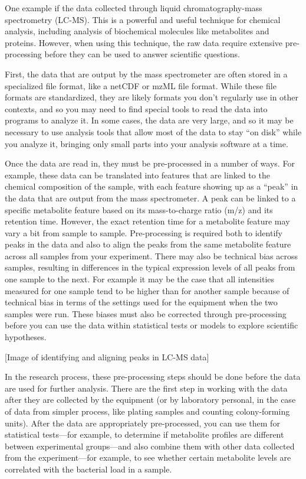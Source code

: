 \documentclass[]{tufte-book}
\begin{document}
One example if the data collected through liquid chromatography-mass
spectrometry (LC-MS). This is a powerful and useful technique for chemical
analysis, including analysis of biochemical molecules like metabolites and
proteins. However, when using this technique, the raw data require extensive
pre-processing before they can be used to answer scientific questions.

First, the data that are output by the mass spectrometer are often stored in a
specialized file format, like a netCDF or mzML file format. While these file
formats are standardized, they are likely formats you don't regularly use in
other contexts, and so you may need to find special tools to read the data into
programs to analyze it. In some cases, the data are very large, and so it may be
necessary to use analysis tools that allow most of the data to stay ``on disk''
while you analyze it, bringing only small parts into your analysis software at a
time.

Once the data are read in, they must be pre-processed in a number of ways. For
example, these data can be translated into features that are linked to the
chemical composition of the sample, with each feature showing up as a ``peak'' in
the data that are output from the mass spectrometer. A peak can be linked to a
specific metabolite feature based on its mass-to-charge ratio (m/z) and its
retention time. However, the exact retention time for a metabolite feature may
vary a bit from sample to sample. Pre-processing is required both to identify
peaks in the data and also to align the peaks from the same metabolite feature
across all samples from your experiment. There may also be technical bias across
samples, resulting in differences in the typical expression levels of all peaks
from one sample to the next. For example it may be the case that all intensities
measured for one sample tend to be higher than for another sample because of
technical bias in terms of the settings used for the equipment when the two
samples were run. These biases must also be corrected through pre-processing
before you can use the data within statistical tests or models to explore scientific hypotheses.

{[}Image of identifying and aligning peaks in LC-MS data{]}

In the research process, these pre-processing steps should be done before
the data are used for further analysis. There are the first step in working
with the data after they are collected by the equipment (or by laboratory
personal, in the case of data from simpler process, like plating samples
and counting colony-forming units). After the data are appropriately
pre-processed, you can use them for statistical tests---for example, to
determine if metabolite profiles are different between experimental groups---and
also combine them with other data collected from the experiment---for example,
to see whether certain metabolite levels are correlated with the bacterial
load in a sample.
\end{document}

